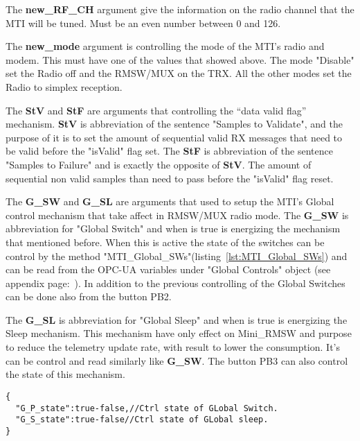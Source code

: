 The \textbf{new\_RF\_CH} argument give the information on the radio channel that the MTI will be tuned. Must be an even number between 0 and 126.

The \textbf{new\_mode} argument is controlling the mode of the MTI's radio and modem. This must have one of the values that showed above. The mode "Disable"
set the Radio off and the RMSW/MUX on the TRX. All the other modes set the Radio to simplex reception.

The \textbf{StV} and \textbf{StF} are arguments that controlling the ``data valid flag'' mechanism. \textbf{StV} is abbreviation of the sentence "Samples to Validate",
and the purpose of it is to set the amount of sequential valid RX messages that need to be valid before the "isValid" flag set.
The \textbf{StF} is abbreviation of the sentence "Samples to Failure" and is exactly the opposite of \textbf{StV}.
The amount of sequential non valid samples than need to pass before the "isValid" flag reset.

The \textbf{G\_SW} and \textbf{G\_SL} are arguments that used to setup the MTI's Global control mechanism that take affect in RMSW/MUX radio mode.
The \textbf{G\_SW} is abbreviation for "Global Switch" and when is true is energizing the mechanism that mentioned before.
When this is active the state of the switches can be control by the method "MTI\_Global\_SWs"(listing~\ref{lst:MTI_Global_SWs}) and can be read from the OPC-UA variables under "Global Controls" object (see appendix page:~\pageref{tree:RMSW/MUX}).
In addition to the previous controlling of the Global Switches can be done also from the button PB2.

The \textbf{G\_SL} is abbreviation for "Global Sleep" and when is true is energizing the Sleep mechanism. This mechanism have only effect on Mini\_RMSW and purpose to reduce the
telemetry update rate, with result to lower the consumption. It's can be control and read similarly like \textbf{G\_SW}. The button PB3 can also control the state of this mechanism.
\newpage
\begin{lstlisting}[frame=single,caption=Argument for MTI\_Global\_SWs(), label=lst:MTI_Global_SWs]
{
  "G_P_state":true-false,//Ctrl state of GLobal Switch.
  "G_S_state":true-false//Ctrl state of GLobal sleep.
}
\end{lstlisting}

